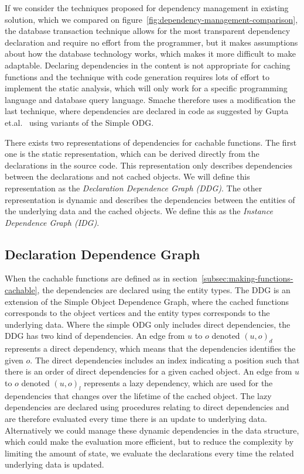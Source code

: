 If we consider the techniques proposed for dependency management in existing solution, which we compared on figure~\ref{fig:dependency-management-comparison}, the database transaction technique allows for the most transparent dependency declaration and require no effort from the programmer, but it makes assumptions about how the database technology works, which makes it more difficult to make adaptable. Declaring dependencies in the content is not appropriate for caching functions and the technique with code generation requires lots of effort to implement the static analysis, which will only work for a specific programming language and database query language. Smache therefore uses a modification the last technique, where dependencies are declared in code as suggested by Gupta et.al.~\cite{paper:cache-genie} using variants of the Simple ODG.

There exists two representations of dependencies for cachable functions. The first one is the static representation, which can be derived directly from the declarations in the source code. This representation only describes dependencies between the declarations and not cached objects. We will define this representation as the \emph{Declaration Dependence Graph (DDG)}. The other representation is dynamic and describes the dependencies between the entities of the underlying data and the cached objects. We define this as the \emph{Instance Dependence Graph (IDG)}.

\subsection{Declaration Dependence Graph}
\label{subsec:declaration-dependence-graph}

When the cachable functions are defined as in section~\ref{subsec:making-functions-cachable}, the dependencies are declared using the entity types. The DDG is an extension of the Simple Object Dependence Graph, where the cached functions corresponds to the object vertices and the entity types corresponds to the underlying data. Where the simple ODG only includes direct dependencies, the DDG has two kind of dependencies. An edge from $u$ to $o$ denoted $(u, o)_d$ represents a direct dependency, which means that the dependencies identifies the given $o$. The direct dependencies includes an index indicating a position such that there is an order of direct dependencies for a given cached object. An edge from $u$ to $o$ denoted $(u, o)_l$ represents a lazy dependency, which are used for the dependencies that changes over the lifetime of the cached object. The lazy dependencies are declared using procedures relating to direct dependencies and are therefore evaluated every time there is an update to underlying data. Alternatively we could manage these dynamic dependencies in the data structure, which could make the evaluation more efficient, but to reduce the complexity by limiting the amount of state, we evaluate the declarations every time the related underlying data is updated.

